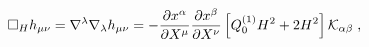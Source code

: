 \begin{equation}
\Box_{H}
h_{\mu\nu}=\nabla^{\lambda}\nabla_{\lambda}h_{\mu\nu}=-\frac{\partial
x^\alpha}{\partial X^\mu} \frac{\partial x^\beta}{\partial X^\nu}
\left[Q_{0}^{(1)}H^2+2H^2\right]{\cal K}_{\alpha\beta} \;,
\end{equation}

